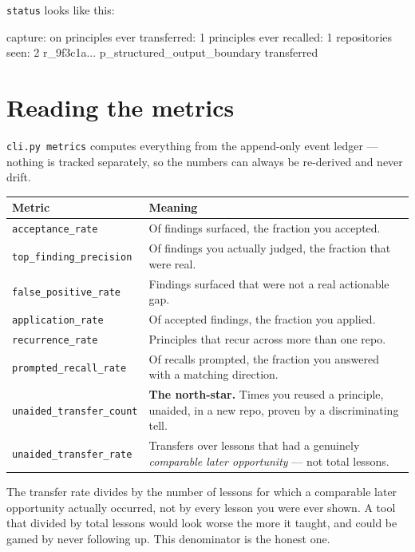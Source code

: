 \documentclass[11pt]{article}
\newcommand{\code}[1]{\textcolor{ink}{\texttt{#1}}}
\begin{document}
\code{status} looks like this:
\begin{term}
capture: on
principles ever transferred: 1
principles ever recalled:    1
repositories seen:           2
  r_9f3c1a...  p_structured_output_boundary  transferred
\end{term}

\section{Reading the metrics}

\code{cli.py metrics} computes everything from the append-only event ledger --- nothing is
tracked separately, so the numbers can always be re-derived and never drift.

\begin{center}\small
\begin{tabular}{@{}p{4.6cm}p{9.2cm}@{}}
\toprule
\textbf{Metric} & \textbf{Meaning} \\
\midrule
\code{acceptance\_rate} & Of findings surfaced, the fraction you accepted. \\
\code{top\_finding\_precision} & Of findings you actually judged, the fraction that were real. \\
\code{false\_positive\_rate} & Findings surfaced that were not a real actionable gap. \\
\code{application\_rate} & Of accepted findings, the fraction you applied. \\
\code{recurrence\_rate} & Principles that recur across more than one repo. \\
\code{prompted\_recall\_rate} & Of recalls prompted, the fraction you answered with a matching direction. \\
\code{unaided\_transfer\_count} & \textbf{The north-star.} Times you reused a principle, unaided, in a new repo, proven by a discriminating tell. \\
\code{unaided\_transfer\_rate} & Transfers over lessons that had a genuinely \emph{comparable later opportunity} --- not total lessons. \\
\bottomrule
\end{tabular}
\end{center}

\begin{tip}
The transfer rate divides by the number of lessons for which a comparable later
opportunity actually occurred, not by every lesson you were ever shown. A tool that divided
by total lessons would look worse the more it taught, and could be gamed by never following
up. This denominator is the honest one.
\end{tip}
\end{document}
